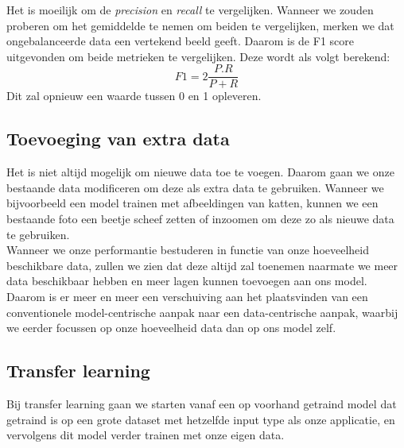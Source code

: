 Het is moeilijk om de \textit{precision} en \textit{recall} te vergelijken. Wanneer we zouden proberen om het gemiddelde te nemen om beiden te vergelijken, merken we dat ongebalanceerde data een vertekend beeld geeft. Daarom is de F1 score uitgevonden om beide metrieken te vergelijken. Deze wordt als volgt berekend:
\begin{equation}
	F1 = 2\frac{P.R}{P +R}
\end{equation}
\noindent
Dit zal opnieuw een waarde tussen 0 en 1 opleveren.

\subsection{Toevoeging van extra data}

Het is niet altijd mogelijk om nieuwe data toe te voegen. Daarom gaan we onze bestaande data modificeren om deze als extra data te gebruiken. Wanneer we bijvoorbeeld een model trainen met afbeeldingen van katten, kunnen we een bestaande foto een beetje scheef zetten of inzoomen om deze zo als nieuwe data te gebruiken. \\
\newline
Wanneer we onze performantie bestuderen in functie van onze hoeveelheid beschikbare data, zullen we zien dat deze altijd zal toenemen naarmate we meer data beschikbaar hebben en meer lagen kunnen toevoegen aan ons model. Daarom is er meer en meer een verschuiving aan het plaatsvinden van een conventionele model-centrische aanpak naar een data-centrische aanpak, waarbij we eerder focussen op onze hoeveelheid data dan op ons model zelf.

\subsection{Transfer learning}

Bij transfer learning gaan we starten vanaf een op voorhand getraind model dat getraind is op een grote dataset met hetzelfde input type als onze applicatie, en vervolgens dit model verder trainen met onze eigen data.